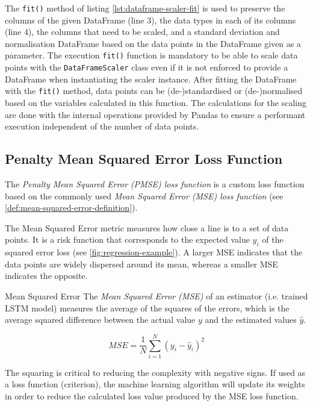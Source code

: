     
    The \texttt{fit()} method of listing \ref{lst:dataframe-scaler-fit} is used to preserve the columns of the given DataFrame (line 3), the data types in each of its columns (line 4), the columns that need to be scaled, and a standard deviation and normalisation DataFrame based on the data points in the DataFrame given as a parameter. The execution \texttt{fit()} function is mandatory to be able to scale data points with the \texttt{DataFrameScaler} class even if it is not enforced to provide a DataFrame when instantiating the scaler instance.
    After fitting the DataFrame with the \texttt{fit()} method, data points can be (de-)standardised or (de-)normalised based on the variables calculated in this function.
    The calculations for the scaling are done with the internal operations provided by Pandas to ensure a performant execution independent of the number of data points.


  \subsection{Penalty Mean Squared Error Loss Function}
  \label{sec:penalty-mse-loss-function-architecture-and-implementation}

    The \emph{Penalty Mean Squared Error (PMSE) loss function} is a custom loss function based on the commonly used \emph{Mean Squared Error (MSE) loss function} \cite{koksoyMultiresponseRobustDesign2006} (see \ref{def:mean-squared-error-definition}). 
    
    The Mean Squared Error metric measures how close a  line is to a set of data points. It is a risk function that corresponds to the expected value $y_i$ of the squared error loss (see \ref{fig:regression-example}). A larger MSE indicates that the data points are widely dispersed around its mean, whereas a smaller MSE indicates the opposite.

    \begin{pabox}{Mean Squared Error}
    \label{def:mean-squared-error-definition}
      The \emph{Mean Squared Error (MSE)} of an estimator (i.e. trained LSTM model) measures the average of the squares of the errors, which is the average squared difference between the actual value $y$ and the estimated values $\hat{y}$.

      $$MSE = \frac{1}{N} \sum_{i = 1}^{N}\left(y_i - \hat{y}_i\right)^2$$

      The squaring is critical to reducing the complexity with negative signs. If used as a loss function (criterion), the machine learning algorithm will update its weights in order to reduce the calculated loss value produced by the MSE loss function.
    \end{pabox}

